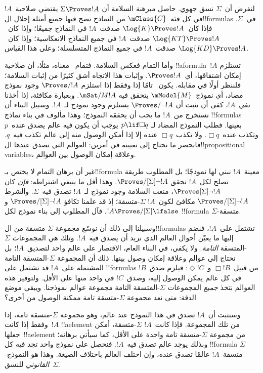 \documentclass[../../../include/open-logic-section]{subfiles}
\begin{document}


لنفرض أن~$\Sigma$ نسق جهوي. حاصل مبرهنة السلامة أن
$\Sigma \Proves !A$ يقتضي صلاحية~$!A$ في كل فئة~$\mClass{C}$ من
النماذج تصح فيها جميع أمثلة إحلال ال!!{formula}s في~$\Sigma$.
فإذا كان~$\Log{K} \Proves !A$ صدقت~$!A$ في النماذج جميعًا؛
وإذا كان~$\Log{KT} \Proves !A$ صدقت~$!A$ في جميع النماذج الانعكاسية؛
وإذا كان~$\Log{KD} \Proves !A$ صدقت~$!A$ في جميع النماذج المتسلسلة؛
وعلى هذا القياس.

وأما التمام فعكس السلامة. فتمام~ معناه، مثلًا، أن صلاحية
!!a{formula}~$!A$ تستلزم إمكان اشتقاقها، أي~$\Proves !A$.
وإثبات هذا الاتجاه أشق كثيرًا من إثبات السلامة؛ فلننظر أولًا في مقابله.
يكون~ تامًا إذا وفقط إذا استلزم $\Proves/ !A$ وجود نموذج مضاد،
أي نموذج~$\mModel{M}$ يتحقق فيه $\mSat/{M}{!A}$.
وبعبارة مكافئة، إذا أخذنا نفي~$!A$، كفى أن نثبت أن
$\Proves/ \lnot !A$ يستلزم وجود نموذج لـ~$!A$.
وسبيل البناء أن نستخرج من~$!A$ ما يجب أن يحققه النموذج؛ وهذا مألوف
في بناء نماذج !!{formula}s بعينها. فطلب النموذج المضاد لـ
$p \lif \Box q$ يوجب أن يكون فيه عالم يصدق عنده~$p$ وتكذب عنده~$\Box q$.
ولا تكذب~$\Box q$ عنده إلا إذا أمكن الوصول منه إلى عالم تكذب فيه~$q$.
فانحصر ما نحتاج إلى تعيينه في أمرين: العوالم التي تصدق عندها
ال!!{propositional variable}s، وعلاقة إمكان الوصول بين العوالم.

غير أن برهان التمام لا يختص بـ!!{formula} معينة~$!A$ نبني لها نموذجًا؛
بل المطلوب طريقة تصلح لكل~$!A$ تحقق $\Proves/[\Sigma] \lnot !A$.
وهذا أقل ما ينبغي اشتراطه: \emph{فإن} كان $\Proves[\Sigma] \lnot !A$،
منعت السلامة وجود نموذج لـ~$!A$ تصدق فيه~$\Sigma$.
والشرط $\Proves/[\Sigma] \lnot !A$ مكافئ لكون~$!A$ $\Sigma$-متسقة؛
إذ قد علمنا تكافؤ $\Proves/[\Sigma] \lnot !A$ و
$!A \Proves/[\Sigma] \lfalse$.
فآل المطلوب إلى بناء نموذج لكل !!{formula} $\Sigma$-متسقة.

وسبيلنا إلى ذلك أن نوسّع مجموعة $\Sigma$-متسقة من
ال!!{formula}s تشتمل على~$!A$، فنضم إليها ما يعيّن أحوال العالم
الذي نريد أن يصدق فيه~$!A$. وتلك هي المجموعات
$\Sigma$-المتسقة \emph{التامة}.
ولا يكفي، في البناء العام، الاقتصار على
عالم واحد لتصديق~$!A$؛ بل نحتاج إلى عوالم وعلاقة إمكان وصول بينها.
ذلك أن المجموعة $\Sigma$-المتسقة التامة المشتملة على~$!A$ قد تشتمل
على !!{formula}s من قبيل~$\Box !B$ و~$\Diamond !C$:
فيلزم صدق~$!B$ في كل عالم يمكن الوصول إليه، وصدق~$!C$ في واحد منها
على الأقل. ولتوفير هذه العوالم نتخذ \emph{جميع} المجموعات
$\Sigma$-المتسقة التامة مجموعة عوالم نموذجنا.
ويبقى موضع الدقة: متى نعد مجموعة $\Sigma$-متسقة تامة
ممكنة الوصول من أخرى؟

وسنثبت أن~$!A$ تصدق في هذا النموذج عند عالم، وهو مجموعة
$\Sigma$-متسقة تامة، إذا وفقط إذا كانت~$!A$ !!a{element} من تلك المجموعة.
فإذا كانت~$!A$ $\Sigma$-متسقة، أمكن جعلها~!!a{element} من مجموعة
$\Sigma$-متسقة تامة واحدة على الأقل، كما سيأتي برهانه؛ وبذلك يوجد
عالم تصدق فيه~$!A$. فنحصل على نموذج واحد تجد فيه كل !!{formula}
$\Sigma$-متسقة~$!A$ عالمًا تصدق عنده، وإن اختلف العالم باختلاف الصيغة.
وهذا هو النموذج \emph{القانوني} للنسق~$\Sigma$.
\end{document}
